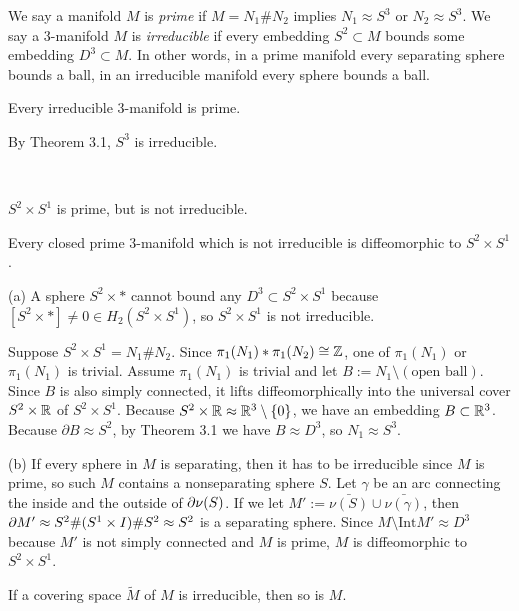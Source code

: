 \documentclass{../../../small}
\begin{document}
We say a manifold $M$ is \emph{prime} if $M=N_1\# N_2$ implies $N_1\approx S^3$ or $N_2\approx S^3$.
We say a 3-manifold $M$ is \emph{irreducible} if every embedding $S^2\subset M$ bounds some embedding $D^3\subset M$.
In other words, in a prime manifold every separating sphere bounds a ball, in an irreducible manifold every sphere bounds a ball.

\begin{cor}
Every irreducible 3-manifold is prime.
\end{cor}
\begin{cor}
By Theorem 3.1, $S^3$ is irreducible.
\end{cor}
\begin{thm}\,
\begin{parts}
\item $S^2\times S^1$ is prime, but is not irreducible.
\item Every closed prime 3-manifold which is not irreducible is diffeomorphic to $S^2\times S^1$.
\end{parts}
\end{thm}
\begin{pf}
(a)
A sphere $S^2\times *$ cannot bound any $D^3\subset S^2\times S^1$ because $[S^2\times *]\ne0\in H_2(S^2\times S^1)$, so $S^2\times S^1$ is not irreducible.

Suppose $S^2\times S^1=N_1\# N_2$.
Since $\pi_1(N_1)*\pi_1(N_2)\cong\mathbb{Z}$, one of $\pi_1(N_1)$ or $\pi_1(N_1)$ is trivial.
Assume $\pi_1(N_1)$ is trivial and let $B:=N_1\setminus(\text{open ball})$.
Since $B$ is also simply connected, it lifts diffeomorphically into the universal cover $S^2\times\mathbb{R}$ of $S^2\times S^1$.
Because $S^2\times\mathbb{R}\approx\mathbb{R}^3\setminus\{0\}$, we have an embedding $B\subset\mathbb{R}^3$.
Because $\partial B\approx S^2$, by Theorem 3.1 we have $B\approx D^3$, so $N_1\approx S^3$.

(b)
If every sphere in $M$ is separating, then it has to be irreducible since $M$ is prime, so such $M$ contains a nonseparating sphere $S$.
Let $\gamma$ be an arc connecting the inside and the outside of $\pd\nu(S)$.
If we let $M':=\bar{\nu(S)}\cup\bar{\nu(\gamma)}$, then $\pd M'\approx S^2\#(S^1\times I)\#S^2\approx S^2$ is a separating sphere.
Since $M\setminus\mathrm{Int}M'\approx D^3$ because $M'$ is not simply connected and $M$ is prime, $M$ is diffeomorphic to $S^2\times S^1$.
\end{pf}

\begin{prop}
If a covering space $\tilde M$ of $M$ is irreducible, then so is $M$.
\end{prop}
\end{document}

